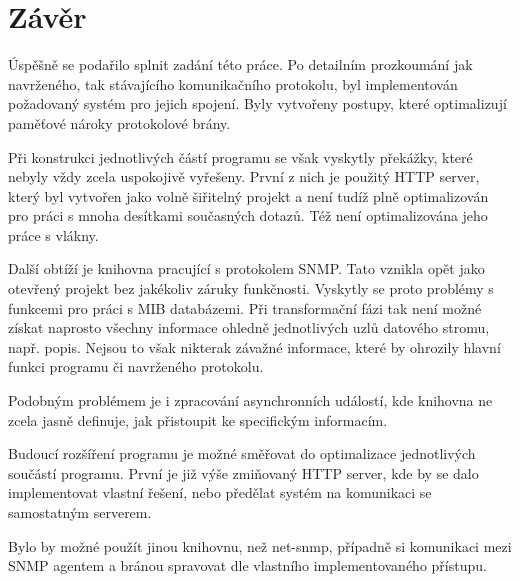\chapter{Závěr}
\label{kap_zaver}
Úspěšně se podařilo splnit zadání této práce. Po detailním prozkoumání jak navrženého, tak stávajícího komunikačního protokolu, byl
implementován požadovaný systém pro jejich spojení. Byly vytvořeny postupy, které optimalizují paměťové nároky protokolové brány.

Při konstrukci jednotlivých částí programu se však vyskytly překážky, které nebyly vždy zcela uspokojivě vyřešeny. První z nich je
použitý HTTP server, který byl vytvořen jako volně šiřitelný projekt a není tudíž plně optimalizován pro práci s mnoha desítkami
současných dotazů. Též není optimalizována jeho práce s vlákny.

Další obtíží je knihovna pracující s protokolem SNMP. Tato vznikla opět jako otevřený projekt bez jakékoliv záruky funkčnosti.
Vyskytly se proto problémy s funkcemi pro práci s MIB databázemi. Při transformační fázi tak není možné získat naprosto všechny 
informace ohledně jednotlivých uzlů datového stromu, např. popis. Nejsou to však nikterak závažné informace, které by ohrozily
hlavní funkci programu či navrženého protokolu.

Podobným problémem je i zpracování asynchronních událostí, kde knihovna ne zcela jasně definuje, jak přistoupit ke specifickým informacím.

Budoucí rozšíření programu je možné směřovat do optimalizace jednotlivých součástí programu. První je již výše zmiňovaný HTTP server,
kde by se dalo implementovat vlastní řešení, nebo předělat systém na komunikaci se samostatným serverem.

Bylo by možné použít jinou knihovnu, než net-snmp, případně si komunikaci mezi SNMP agentem a bránou spravovat dle vlastního implementovaného
přístupu.



